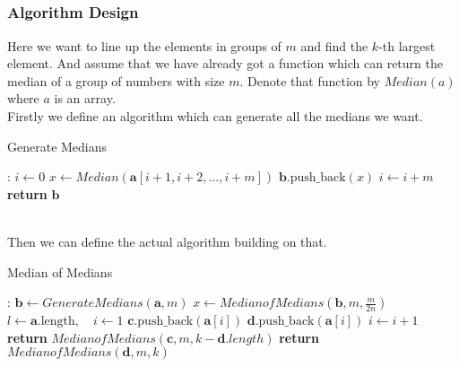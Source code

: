 \documentclass[12pt,letterpaper]{article}
\begin{document}
\subsection{}
\subsubsection{Algorithm Design}
Here we want to line up the elements in groups of $m$ and find the $k$-th largest element. And assume that we have already got a function which can return the median of a group of numbers with size $m$. Denote that function by $Median(a)$ where $a$ is an array.\\
Firstly we define an algorithm which can generate all the medians we want.
\begin{algorithm}
    \caption{Generate Medians}\label{alg:gm}
    \begin{algorithmic}[1]
    :
    \State $i\gets 0$
    \State $x\gets Median(\boldsymbol{a}[i+1,i+2,\dots,i+m])$
    \State $\boldsymbol{b}\text{.push\_back}(x)$
    \State $i\gets i+m$
    \EndWhile
    \State \textbf{return} $\boldsymbol{b}$
    \EndProcedure
    \end{algorithmic}
\end{algorithm}\\
Then we can define the actual algorithm building on that.
\begin{algorithm}
    \caption{Median of Medians}\label{alg:mofm}
    \begin{algorithmic}[1]
    :
    \EndIf
    \State $\boldsymbol{b}\gets Generate Medians(\boldsymbol{a},m)$
    \State $x\gets MedianofMedians(\boldsymbol{b},m,\frac{m}{2n})$
    \State $l\gets \boldsymbol{a}\text{.length}, \quad i\gets 1$
     $\boldsymbol{c}.\text{push\_back}(\boldsymbol{a}[i])$
    \EndIf
     $\boldsymbol{d}.\text{push\_back}(\boldsymbol{a}[i])$
    \EndIf 
    \State $i\gets i+1$
    \EndWhile
     \textbf{return} $MedianofMedians(\boldsymbol{c},m,k-\boldsymbol{d}.length)$
    \EndIf
     \textbf{return} $MedianofMedians(\boldsymbol{d},m,k)$
    \EndIf
    \EndProcedure
    \end{algorithmic}
\end{algorithm}
\end{document}

